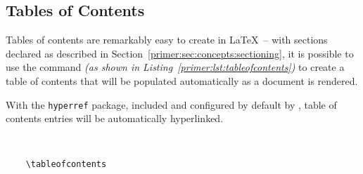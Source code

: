 \subsection{Tables of Contents}
Tables of contents are remarkably easy to create in \LaTeX\ -- with sections declared as described in Section~\ref{primer:sec:concepts:sectioning}, it is possible to use the  command \textit{(as shown in Listing~\ref{primer:lst:tableofcontents})} to create a table of contents that will be populated automatically as a document is rendered.

With the \texttt{hyperref} package, included and configured by default by \uswdwmspkg{}, table of contents entries will be automatically hyperlinked.

\begin{listing}[H]
  \captionsetup{skip=\skiplistingcaptionlen}
  \begin{verbatim}
    
    
    \tableofcontents
  \end{verbatim}
  \caption{\texttt{\textbackslash tableofcontents} command example}
  \label{primer:lst:tableofcontents}
\end{listing}
